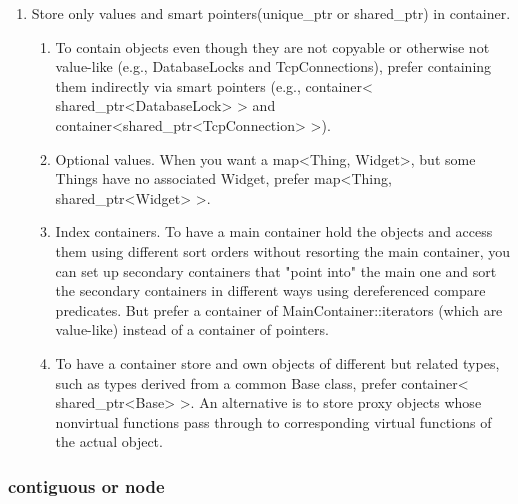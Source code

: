 \documentclass[a4paper,12pt,twoside]{book}
\begin{document}
\begin{itemize}
\begin{enumerate}
\item Store only values and smart pointers(unique\_ptr or shared\_ptr) in container.
\begin{enumerate}
\item To contain objects even though they are
not copyable or otherwise not value-like (e.g., DatabaseLocks and
TcpConnections), prefer containing them indirectly via smart pointers (e.g.,
container< shared\_ptr<DatabaseLock> > and container<shared\_ptr<TcpConnection> >).
\item Optional values. When you want a map<Thing, Widget>, but some
Things have no associated Widget, prefer map<Thing, shared\_ptr<Widget> >.
\item Index containers. To have a main container hold the objects and access them using different sort orders without resorting the main container, you can set up secondary containers that "point into" the main one and sort the secondary containers in different ways using dereferenced compare predicates. But prefer a container of MainContainer::iterators (which are value-like) instead of a container of pointers.

\item To have a container store and own objects of different but related types, such as types derived from a common Base class, prefer container< shared\_ptr<Base> >. An alternative is to store proxy objects whose nonvirtual functions pass through to corresponding virtual functions of the actual object.
\end{enumerate}

\end{enumerate}

\end{itemize}


\subsubsection{contiguous or node}
\end{document}
